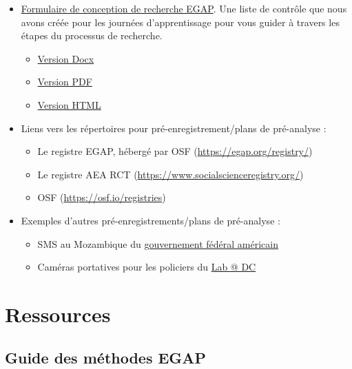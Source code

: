 \documentclass[12pt,]{book}
\begin{document}
\begin{itemize}
\item
  \href{https://egap.github.io/learningdays-resources/Exercises/design-form.html}{Formulaire de conception de recherche EGAP}. Une liste de contrôle que nous avons créée pour les journées d'apprentissage pour vous guider à travers les étapes du processus de recherche.

  \begin{itemize}
  \item
    \href{https://egap.github.io/learningdays-resources/Exercises/design-form.docx}{Version Docx}
  \item
    \href{https://egap.github.io/learningdays-resources/Exercises/design-form.pdf}{Version PDF}
  \item
    \href{https://egap.github.io/learningdays-resources/Exercises/design-form.html}{Version HTML}
  \end{itemize}
\item
  Liens vers les répertoires pour pré-enregistrement/plans de pré-analyse :

  \begin{itemize}
  \item
    Le registre EGAP, hébergé par OSF (\url{https://egap.org/registry/})
  \item
    Le registre AEA RCT (\url{https://www.socialscienceregistry.org/})
  \item
    OSF (\url{https://osf.io/registries})
  \end{itemize}
\item
  Exemples d'autres pré-enregistrements/plans de pré-analyse :

  \begin{itemize}
  \item
    SMS au Mozambique du \href{https://oes.gsa.gov/projects/sms-mozambique/}{gouvernement fédéral américain}
  \item
    Caméras portatives pour les policiers du \href{https://osf.io/472zh}{Lab @ DC}
  \end{itemize}
\end{itemize}

\hypertarget{ressources}{%
\section{Ressources}\label{ressources}}

\hypertarget{guide-des-muxe9thodes-egap}{%
\subsection{Guide des méthodes EGAP}\label{guide-des-muxe9thodes-egap}}
\end{document}
